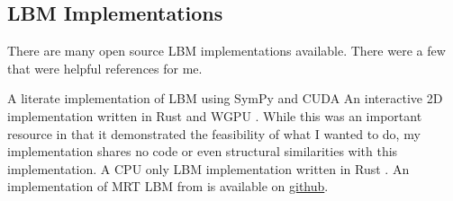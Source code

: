 \subsection{LBM Implementations}

There are many open source LBM implementations available.
There were a few that were helpful references for me.
\begin{outline}
  \1 A literate implementation of LBM using SymPy and CUDA \cite{web:literate_lbm}
  \1 An interactive 2D implementation written in Rust and WGPU \cite{web:lbm-web}.
  \2 While this was an important resource in that it demonstrated 
  the feasibility of what I wanted to do, 
  my implementation shares no code or even structural similarities 
  with this implementation.
  \1 A CPU only LBM implementation written in Rust \cite{web:lbm-rs}.
  \1 An implementation of MRT LBM from \cite{Yang2022} is available on \href{https://github.com/yjhp1016/taichi_LBM3D/}{github}.
\end{outline}
